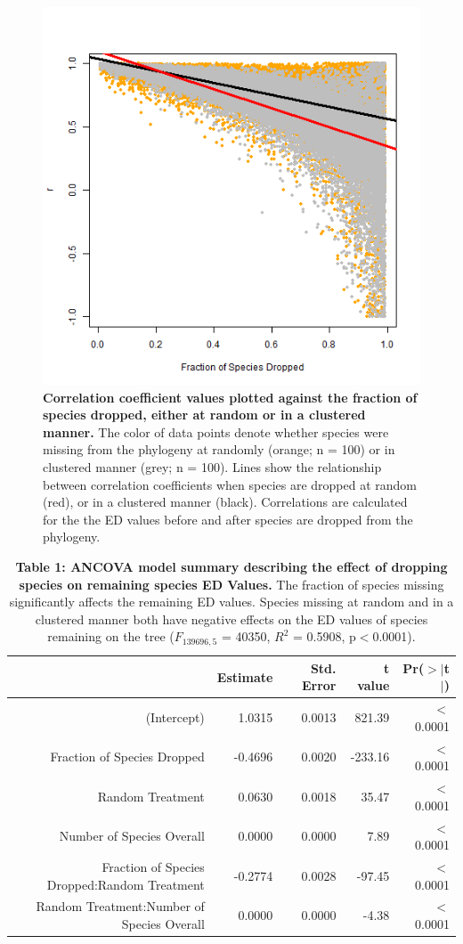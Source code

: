 \documentclass[12pt,english]{article}
\begin{document}
\begin{figure}[!ht]
  \center
  \includegraphics[width=.5\textwidth]{randomVsCluster.png}
  \caption{\textbf{Correlation coefficient values plotted against the fraction
  of species dropped, either at random or in a clustered manner.} The color of
  data points denote whether species were missing from the phylogeny at randomly
  (orange; n = 100) or in clustered manner (grey; n = 100). Lines show the
  relationship between correlation coefficients when species are dropped at
  random (red), or in a clustered manner (black). Correlations are calculated
  for the the ED values before and after species are dropped from the phylogeny.
  }
  \label{randomVsClustered}
\end{figure}

\begin{table}[ht]
  \centering
  \begin{tabular}{rrrrr}
    \hline
      & Estimate & Std. Error & t value & Pr($>$$|$t$|$) \\
      \hline
      (Intercept) & 1.0315 & 0.0013 & 821.39 & $<$0.0001 \\
      Fraction of Species Dropped & -0.4696 & 0.0020 & -233.16 & $<$0.0001 \\
      Random Treatment & 0.0630 & 0.0018 & 35.47 & $<$0.0001 \\
      Number of Species Overall & 0.0000 & 0.0000 & 7.89 & $<$0.0001 \\
      Fraction of Species Dropped:Random Treatment & -0.2774 & 0.0028 & -97.45 & $<$0.0001 \\
      Random Treatment:Number of Species Overall & 0.0000 & 0.0000 & -4.38 & $<$0.0001 \\
      \hline
    \hline
  \end{tabular}
\caption*{\textbf{Table 1: ANCOVA model summary describing the effect of
dropping species on remaining species ED Values.} The fraction of species
missing significantly affects the remaining ED values. Species missing at
random and in a clustered manner both have negative effects on the ED values of
species remaining on the tree ($F_{139696, 5}$ = 40350, $R^{2}$ = 0.5908,
p$<$0.0001).}
\end{table}
\end{document}
